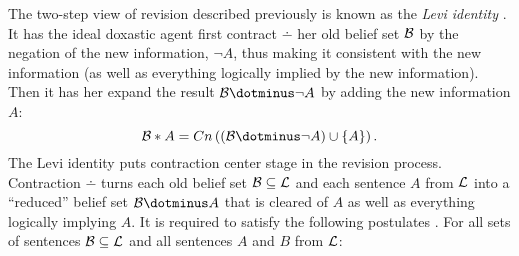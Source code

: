The two-step view of revision described previously is known as the \emph{Levi identity} \citep{l77}. It has the ideal doxastic agent first contract $\dotminus$ her old belief set $\cal B$ by the negation of the new information, $\neg A$, thus making it consistent with the new information (as well as everything logically implied by the new information). Then it has her expand the result $\begin{cal}B\end{cal}\dotminus\neg A$ by adding the new information $A$:
$$\begin{cal}B\end{cal}*A=Cn\left(\left(\begin{cal}B\end{cal}\dotminus\neg A\right)\cup\left\{A\right\}\right).$$
The Levi identity puts contraction center stage in the revision process. Contraction $\dotminus$ turns each old belief set $\cal B\subseteq L$ and each sentence $A$ from $\cal L$ into a ``reduced'' belief set $\begin{cal}B\end{cal}\dotminus A$ that is cleared of $A$ as well as everything logically implying $A$. It is required to satisfy the following postulates%
. For all sets of sentences $\cal B\subseteq L$ and all sentences $A$ and $B$ from $\cal L$:
